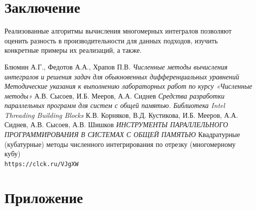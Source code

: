 \documentclass{report}
\begin{document}
\part{Заключение}
Реализованные алгоритмы вычисления многомерных интегралов позволяют оценить разность в производительности
для данных подходов, изучить конкретные примеры их реализаций, а также.
\begin{thebibliography}{9}
Блюмин А.Г., Федотов А.А., Храпов П.В.
\textit{Численные методы вычисления интегралов и решения задач для обыкновенных дифференциальных уравнений Методические указания
к выполнению лабораторных работ по курсу «Численные методы»}
А.В. Сысоев, И.Б. Мееров, А.А. Сиднев
\textit{Средства разработки параллельных программ для систем
с общей памятью. Библиотека Intel Threading Building 
Blocks}
К.В. Корняков, В.Д. Кустикова, И.Б. Мееров, А.А. Сиднев, А.В. Сысоев, А.В. Шишков
\textit{ИНСТРУМЕНТЫ ПАРАЛЛЕЛЬНОГО ПРОГРАММИРОВАНИЯ В СИСТЕМАХ С ОБЩЕЙ ПАМЯТЬЮ}
Квадратурные (кубатурные) методы численного интегрирования по отрезку (многомерному кубу)
\\\texttt{https://clck.ru/VJgXW}
\end{thebibliography}
\part{Приложение}
\end{document}
